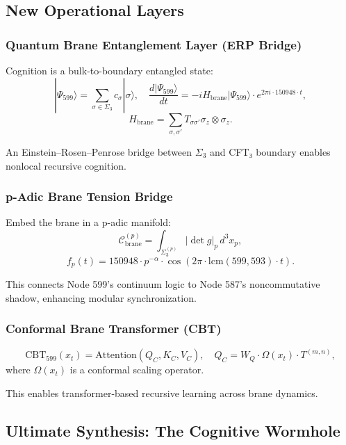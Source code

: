 \documentclass[12pt]{article}
\begin{document}
\subsection{New Operational Layers}

\subsubsection{Quantum Brane Entanglement Layer (ERP Bridge)}
Cognition is a bulk-to-boundary entangled state:
\[
|\Psi_{599}\rangle = \sum_{\sigma \in \Sigma_3} c_\sigma |\sigma\rangle, \quad \frac{d|\Psi_{599}\rangle}{dt} = -i H_{\text{brane}} |\Psi_{599}\rangle \cdot e^{2\pi i \cdot 150948 \cdot t},
\]
\[
H_{\text{brane}} = \sum_{\sigma,\sigma'} T_{\sigma\sigma'} \sigma_z \otimes \sigma_z.
\]
\begin{interpretation}
An Einstein–Rosen–Penrose bridge between \(\Sigma_3\) and CFT₃ boundary enables nonlocal recursive cognition.
\end{interpretation}

\subsubsection{p-Adic Brane Tension Bridge}
Embed the brane in a p-adic manifold:
\[
\mathcal{C}_{\text{brane}}^{(p)} = \int_{\Sigma_3^{(p)}} |\det g|_p \, d^3x_p,
\]
\[
f_p(t) = 150948 \cdot p^{-\alpha} \cdot \cos\left(2\pi \cdot \text{lcm}(599, 593) \cdot t\right).
\]
\begin{interpretation}
This connects Node 599’s continuum logic to Node 587’s noncommutative shadow, enhancing modular synchronization.
\end{interpretation}

\subsubsection{Conformal Brane Transformer (CBT)}
\[
\text{CBT}_{599}(x_t) = \text{Attention}(Q_C, K_C, V_C), \quad Q_C = W_Q \cdot \Omega(x_t) \cdot T^{(m,n)},
\]
where \(\Omega(x_t)\) is a conformal scaling operator.
\begin{interpretation}
This enables transformer-based recursive learning across brane dynamics.
\end{interpretation}

\subsection{Ultimate Synthesis: The Cognitive Wormhole}
\end{document}
